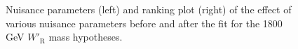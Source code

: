 \begin{figure}[H]
  \centering
  \caption{Nuisance parameters (left) and ranking plot (right) of the effect of various nuisance parameters before and after the fit for the 1800 GeV $W'_{\text{R}}$ mass hypotheses.}
  \label{fig:NuisParAndRanking_WpRH1800}
\end{figure}
